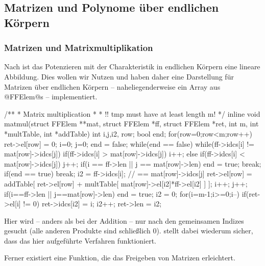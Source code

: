 \subsection{Matrizen und Polynome über endlichen Körpern}

\subsubsection{Matrizen und Matrixmultiplikation}

Nach  ist das Potenzieren mit der Charakteristik in
endlichen Körpern eine lineare Abbildung. Dies wollen wir Nutzen und haben
daher eine Darstellung für Matrizen über endlichen Körpern -- naheliegenderweise
ein Array aus @FFElem@s -- implementiert.

\begin{ccode}[caption={[\texttt{void matmul} aus 
 \url{../Sage/enumeratePCNs.c}]Aus \url{../Sage/enumeratePCNs.c}}]
/**
 * Matrix multiplication
 *
 * !! tmp must have at least length m!
 */
inline void matmul(struct FFElem **mat, struct FFElem *ff,
        struct FFElem *ret, 
        int m, int *multTable, int *addTable){
    int i,j,i2, row;
    bool end;
    for(row=0;row<m;row++){
        ret->el[row] = 0;
        i=0; j=0;
        end = false;
        while(end == false){
            while(ff->idcs[i] != mat[row]->idcs[j]){
                if(ff->idcs[i] > mat[row]->idcs[j]) i++;
                else if(ff->idcs[i] < mat[row]->idcs[j]) j++;
                if(i == ff->len || j == mat[row]->len){
                    end = true;
                    break;
                }
            }
            if(end == true) break;
            i2 = ff->idcs[i]; // == mat[row]->idcs[j]
            ret->el[row] = addTable[ ret->el[row] 
                + multTable[ mat[row]->el[i2]*ff->el[i2] ] ];
            i++;
            j++;
            if(i==ff->len || j==mat[row]->len) end = true;
        }
    }
    i2 = 0;
    for(i=m-1;i>=0;i--){
        if(ret->el[i] != 0){
            ret->idcs[i2] = i;
            i2++;
        }
    }
    ret->len = i2;
}
\end{ccode}

Hier wird -- anders als bei der Addition -- nur nach den gemeinsamen Indizes
gesucht (alle anderen Produkte sind schließlich 0). 
 stellt dabei wiederum sicher, dass das hier
aufgeführte Verfahren funktioniert.

Ferner existiert eine Funktion, die das Freigeben von Matrizen erleichtert.

